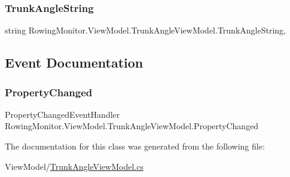 \subsubsection{\texorpdfstring{Trunk\+Angle\+String}{TrunkAngleString}}
{\footnotesize\ttfamily string Rowing\+Monitor.\+View\+Model.\+Trunk\+Angle\+View\+Model.\+Trunk\+Angle\+String\hspace{0.3cm}{\ttfamily [get]}, {\ttfamily [set]}}



\subsection{Event Documentation}
\mbox{\label{class_rowing_monitor_1_1_view_model_1_1_trunk_angle_view_model_afbf525541d69036a9e40d427d08084c1}} 
\subsubsection{\texorpdfstring{Property\+Changed}{PropertyChanged}}
{\footnotesize\ttfamily Property\+Changed\+Event\+Handler Rowing\+Monitor.\+View\+Model.\+Trunk\+Angle\+View\+Model.\+Property\+Changed}



The documentation for this class was generated from the following file\+:\begin{DoxyCompactItemize}
\item 
View\+Model/\hyperlink{_trunk_angle_view_model_8cs}{Trunk\+Angle\+View\+Model.\+cs}\end{DoxyCompactItemize}
